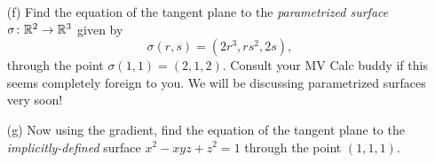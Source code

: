 \documentclass[a4paper, 12pt]{article}
\begin{document}
\begin{problem} 
\begin{enumerate}
        \[P = \{x\in \bbr^3: \alpha(x,v,w) = \langle x, v\times w\rangle = 0\}.
        \]
        Use this to find the equation $ax_1 + bx_2 + cx_3  = d$ of the plane through the point $(2,1,2)$ and spanned by the vectors  $(6,1,0), (0,2,2)$.
    \item[(f)] Find the equation of the tangent plane to the {\em parametrized surface} $\sigma\colon \mathbb{R}^2\to \mathbb{R}^3$ given by
        \[\sigma(r, s) = (2r^3, rs^2, 2s),
        \]
        through the point $\sigma(1,1) = (2,1,2)$. Consult your MV Calc buddy if this seems completely foreign to you. We will be discussing parametrized surfaces very soon!
    \item[(g)] Now using the gradient, find the equation of the tangent plane to the {\em implicitly-defined} surface $x^2 - xyz + z^2 = 1$ through the point $(1,1,1)$.
\end{enumerate}
\end{problem}
\end{document}
